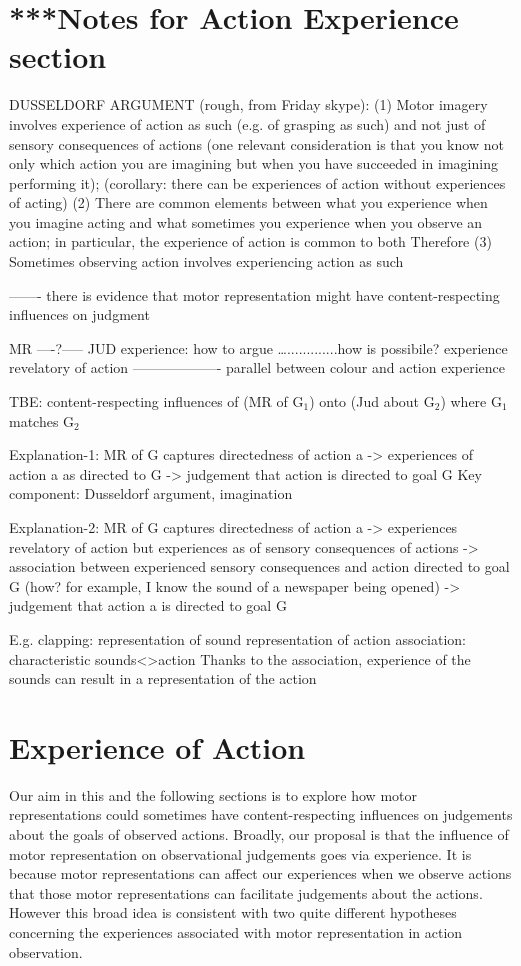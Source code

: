 \documentclass[12pt,\papersize]{extarticle}
\begin{document}
\section{***Notes for Action Experience section}


DUSSELDORF ARGUMENT (rough, from Friday skype):
(1) Motor imagery involves experience of action as such (e.g. of grasping as such) and not just of sensory consequences of actions
(one relevant consideration is that you know not only which action you are imagining but when you have succeeded in imagining performing it);
(corollary: there can be experiences of action without experiences of acting)
(2) There are common elements between what you  experience when you imagine acting and what sometimes you experience when you observe an action; in particular, the experience of action is common to both
Therefore
(3) Sometimes observing action involves experiencing action as such



------- there is evidence that motor representation might have content-respecting influences on judgment

MR ----?----- JUD
  experience: how to argue 
….............how is possibile? experience revelatory of action
------------------- parallel between colour and action experience

TBE: content-respecting influences of (MR of G$_1$) onto (Jud about G$_2$) where G$_1$ matches G$_2$


Explanation-1: MR of G captures directedness of action a -> experiences of action a as directed to G -> judgement that action is directed to goal G
	Key component: Dusseldorf argument, imagination

Explanation-2: MR of G captures directedness of action a -> experiences revelatory of action but experiences as of sensory consequences of actions -> association between experienced sensory consequences and action directed to goal G (how? for example, I know the sound of a newspaper being opened) -> judgement that action a is directed to goal G

E.g. clapping:
	representation of sound
	representation of action
	association: characteristic sounds<>action
	Thanks to the association, experience of the sounds can result in a representation of the action





\section{Experience of Action}
\label{sec:processes}
Our aim in this and the following sections is to explore how motor representations could sometimes have content-respecting influences on judgements about the goals of observed actions. Broadly, our proposal is that the influence of motor representation on observational judgements goes via experience.  It is because motor representations can affect our experiences when we observe actions that those motor representations can facilitate judgements about the actions. However this broad idea is consistent with two quite different hypotheses concerning the experiences associated with motor representation in action observation. 
\end{document}
